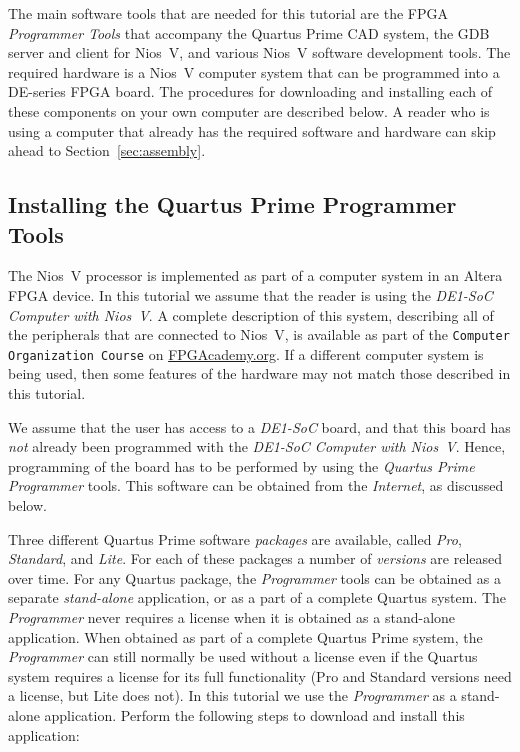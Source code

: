 \documentclass[11pt, twoside, pdftex]{article}
\begin{document}
The main software tools that are needed for this tutorial are the FPGA {\it Programmer
Tools} that accompany the Quartus Prime CAD system, the GDB server and client for Nios~V, and 
various Nios~V software development tools. The required hardware is a Nios~V computer
system that can be programmed into a DE-series FPGA board. The procedures for downloading and 
installing each of these components on your own computer are described below. A reader who 
is using a computer that already has the required software and hardware can skip ahead to 
Section~\ref{sec:assembly}. 

\subsection{Installing the Quartus Prime Programmer Tools}
\label{sec:programmer}

The Nios~V processor is implemented as part of a computer system in an Altera FPGA device. 
In this tutorial we assume that the reader is using the {\it DE1-SoC Computer with Nios~V}.
A complete description of this system, describing all of the peripherals that are
connected to Nios~V, is available as part of the \texttt{Computer Organization Course} 
on {\small \href{https://www.fpgacademy.org/courses.html} {FPGAcademy.org}}. If a
different computer system is being used, then some features of the hardware may not match
those described in this tutorial.

We assume that the user has access to a {\it DE1-SoC} board, and that this board has {\it not} 
already been programmed with the {\it DE1-SoC Computer with Nios~V}. Hence, programming of 
the board has to be performed by using the {\it Quartus Prime Programmer} tools. This 
software can be obtained from the {\it Internet}, as discussed below. 

Three different Quartus Prime software {\it packages} are available, called {\it Pro},
{\it Standard}, and {\it Lite}. For each of these packages a number of {\it versions} are
released over time.  For any Quartus package, the {\it Programmer} tools can be 
obtained as a separate {\it stand-alone} application, or as a part of a complete 
Quartus system. The {\it Programmer} never requires a license when it is obtained as a
stand-alone application. When obtained as part of a complete Quartus Prime system, the
{\it Programmer} can still normally be used without a license even if the Quartus system 
requires a license for its full functionality (Pro and Standard versions need a license, but 
Lite does not). In this tutorial we use the {\it Programmer} as a stand-alone application. 
Perform the following steps to download and install this application:
\end{document}
